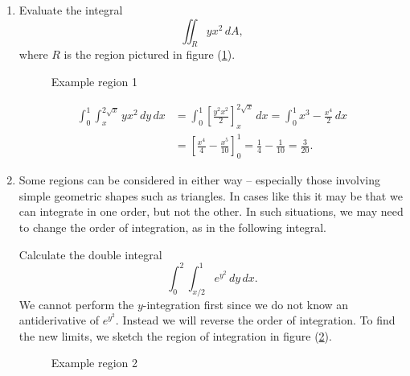   \begin{examples}  
  \quad
    \begin{enumerate}
    \item Evaluate the integral
      \[
        \iint_R yx^2 \, dA,
      \]
    where $R$ is the region pictured in figure (\ref{regionexample1}).

  \begin{figure}[H]
    \centering
    \def\svgwidth{0.35\columnwidth}
    
    \caption{Example region 1}
    \label{regionexample1}
  \end{figure}

    \begin{align*}
      \int_0^1 \int_x^{2\sqrt{x}} yx^2 \, dy \, dx & = \int_0^1 \left[ \frac{y^2 x^2}{2} \right]_x^{2\sqrt{x}} \, dx = \int_0^1 x^3 - \frac{x^4}{2} \, dx  \\
      & = \left[ \frac{x^4}{4} - \frac{x^5}{10} \right]_0^1 = \frac{1}{4} - \frac{1}{10} = \frac{3}{20}.
    \end{align*}
    \item Some regions can be considered in either way -- especially those involving simple geometric shapes such as triangles.  In cases like this it may be that we can integrate in one order, but not the other.  In such situations, we may need to change the order of integration, as in the following integral.
    
    Calculate the double integral
      \[
        \int_0^2 \int_{x/2}^1 e^{y^2} \, dy \, dx.
      \]
    We cannot perform the $y$-integration first since we do not know an antiderivative of $e^{y^2}$.  Instead we will reverse the order of integration.  To find the new limits, we sketch the region of integration in figure (\ref{regionexample2}).
  \begin{figure}[H]
    \centering
    \def\svgwidth{0.4\columnwidth}
    
    \caption{Example region 2}
    \label{regionexample2}
  \end{figure}


\end{enumerate}
\end{examples}
